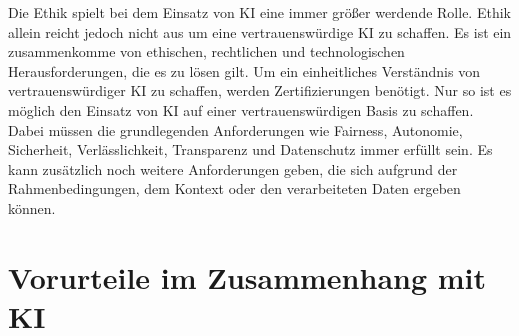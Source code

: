 \begin{onehalfspace}
        Die Ethik spielt bei dem Einsatz von \ac*{KI} eine immer größer werdende Rolle. Ethik allein reicht jedoch nicht aus um eine vertrauenswürdige \ac*{KI} zu schaffen. Es ist ein zusammenkomme von ethischen, rechtlichen und technologischen Herausforderungen, die es zu lösen gilt. Um ein einheitliches Verständnis von vertrauenswürdiger \ac*{KI} zu schaffen, werden Zertifizierungen benötigt. Nur so ist es möglich den Einsatz von \ac*{KI} auf einer vertrauenswürdigen Basis zu schaffen. Dabei müssen die grundlegenden Anforderungen wie Fairness, Autonomie, Sicherheit, Verlässlichkeit, Transparenz und Datenschutz immer erfüllt sein. Es kann zusätzlich noch weitere Anforderungen geben, die sich aufgrund der Rahmenbedingungen, dem Kontext oder den verarbeiteten Daten ergeben können.\cite{Cremers2019}\cite{Hagendorff2020}

    \newpage
    \section{Vorurteile im Zusammenhang mit \ac{KI}}
    \label{subsec:KIundbias}

\end{onehalfspace}

